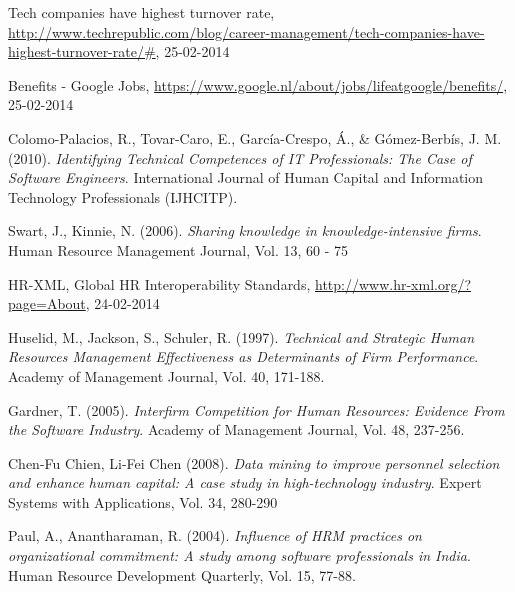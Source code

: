 \documentclass{article}
\begin{document}
\begin{thebibliography}{9}

 Tech companies have highest turnover rate, \url{http://www.techrepublic.com/blog/career-management/tech-companies-have-highest-turnover-rate/#}, 25-02-2014

 Benefits - Google Jobs, \url{https://www.google.nl/about/jobs/lifeatgoogle/benefits/}, 25-02-2014

 Colomo-Palacios, R., Tovar-Caro, E., García-Crespo, Á., \& Gómez-Berbís, J. M. (2010). \textit{Identifying Technical Competences of IT Professionals: The Case of Software Engineers}. International Journal of Human Capital and Information Technology Professionals (IJHCITP).

 Swart, J., Kinnie, N. (2006). \textit{Sharing knowledge in knowledge-intensive firms}. Human Resource Management Journal, Vol. 13, 60 - 75

 HR-XML, Global HR Interoperability Standards, \url{http://www.hr-xml.org/?page=About}, 24-02-2014

 Huselid, M., Jackson, S., Schuler, R. (1997). \textit{Technical and Strategic Human Resources Management Effectiveness as Determinants of Firm Performance}. Academy of Management Journal, Vol. 40, 171-188.

 Gardner, T. (2005). \textit{Interfirm Competition for Human Resources: Evidence From the Software Industry}. Academy of Management Journal, Vol. 48, 237-256.

 Chen-Fu Chien, Li-Fei Chen (2008).\textit{ Data mining to improve personnel selection and enhance human capital: A case study in high-technology industry}. Expert Systems with Applications, Vol. 34, 280-290

 Paul, A., Anantharaman, R. (2004). \textit{Influence of HRM practices on organizational commitment: A study among software professionals in India}. Human Resource Development Quarterly, Vol. 15, 77-88.


\end{thebibliography}
\end{document}
